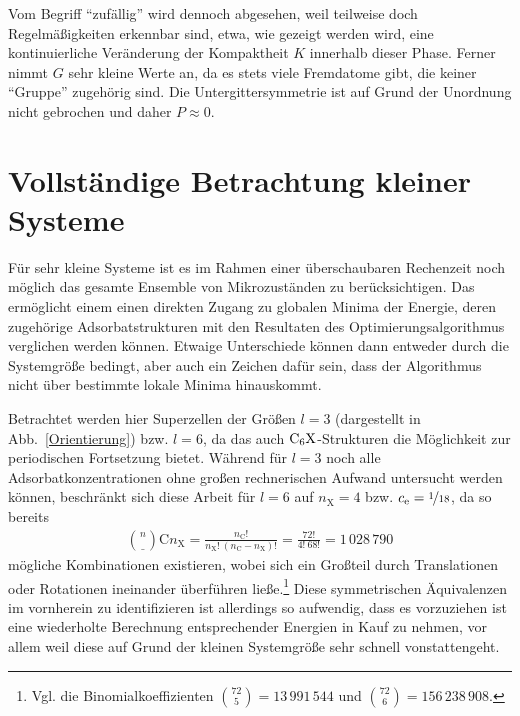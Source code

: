 \documentclass[a4paper, 10pt, twoside, openany]{book} %
\def \nC {n_\mathrm{C}}
\def \nX {n_\mathrm{X}}
\def \cE {c_\mathrm{e}}
\begin{document}
Vom Begriff "`zufällig"' wird dennoch abgesehen, weil teilweise doch Regelmäßigkeiten erkennbar sind, etwa, wie gezeigt werden wird, eine kontinuierliche Veränderung der Kompaktheit $K$ innerhalb dieser Phase. Ferner nimmt $G$ sehr kleine Werte an, da es stets viele Fremdatome gibt, die keiner "`Gruppe"' zugehörig sind. Die Untergittersymmetrie ist auf Grund der Unordnung nicht gebrochen und daher $P \approx 0$.

\section{Vollständige Betrachtung kleiner Systeme}
\label{kleine Systeme}

Für sehr kleine Systeme ist es im Rahmen einer überschaubaren Rechenzeit noch möglich das gesamte Ensemble von Mikrozuständen zu berücksichtigen. Das ermöglicht einem einen direkten Zugang zu globalen Minima der Energie, deren zugehörige Adsorbatstrukturen mit den Resultaten des Optimierungsalgorithmus verglichen werden können. Etwaige Unterschiede können dann entweder durch die Systemgröße bedingt, aber auch ein Zeichen dafür sein, dass der Algorithmus nicht über bestimmte lokale Minima hinauskommt.

Betrachtet werden hier Superzellen der Größen $l = 3$ (dargestellt in Abb.~\ref{Orientierung}) bzw. $l = 6$, da das auch $\rm C_6X$-Strukturen die Möglichkeit zur periodischen Fortsetzung bietet. Während für $l = 3$ noch alle Adsorbatkonzentrationen ohne großen rechnerischen Aufwand untersucht werden können, beschränkt sich diese Arbeit für $l = 6$ auf $\nX = 4$ bzw. $\cE = \nicefrac 1 {18}$, da so bereits
%
\begin{align*}
    \binom \nC \nX = \frac{\nC!}{\nX! \ (\nC - \nX)!} = \frac{72!}{4! \ 68!} = 1 \, 028 \, 790
\end{align*}
%
mögliche Kombinationen existieren, wobei sich ein Großteil durch Translationen oder Rotationen ineinander überführen ließe.\footnote{Vgl. die Binomialkoeffizienten $\binom {72} 5 = 13 \, 991 \, 544$ und $\binom {72} 6 = 156 \, 238 \, 908$.} Diese symmetrischen Äquivalenzen im vornherein zu identifizieren ist allerdings so aufwendig, dass es vorzuziehen ist eine wiederholte Berechnung entsprechender Energien in Kauf zu nehmen, vor allem weil diese auf Grund der kleinen Systemgröße sehr schnell vonstattengeht.
\end{document}
